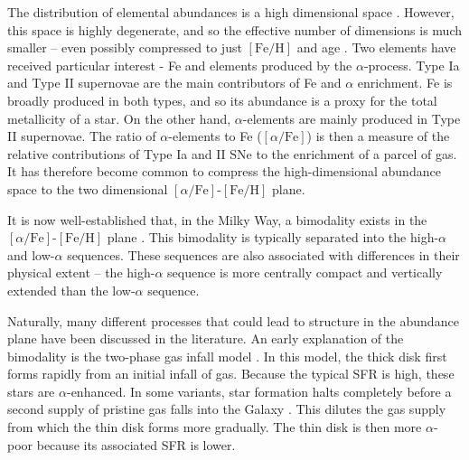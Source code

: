 \documentclass[linenumbers, twocolumn]{aastex631}
\newcommand{\FeH}{\ensuremath{[\textrm{Fe}/\textrm{H}]}}
\newcommand{\alphaFe}{\ensuremath{[\alpha/\textrm{Fe}]}}
\begin{document}

The distribution of elemental abundances is a high dimensional space \citep[e.g., 32 elements in][]{2024ApJ...961L..41J}. However, this space is highly degenerate, and so the effective number of dimensions is much smaller -- even possibly compressed to just \FeH{} and age \citep{2019ApJ...883..177N}. Two elements have received particular interest - Fe and elements produced by the $\alpha$-process. Type Ia and Type II supernovae are the main contributors of Fe and $\alpha$ enrichment. Fe is broadly produced in both types, and so its abundance is a proxy for the total metallicity of a star. On the other hand, $\alpha$-elements are mainly produced in Type II supernovae. The ratio of $\alpha$-elements to Fe (\alphaFe{}) is then a measure of the relative contributions of Type Ia and II SNe to the enrichment of a parcel of gas. It has therefore become common to compress the high-dimensional abundance space to the two dimensional \alphaFe{}-\FeH{} plane.

It is now well-established that, in the Milky Way, a bimodality exists in the \alphaFe{}-\FeH{} plane \citep{1996ASPC...92..307G,1998A&A...338..161F,2004AN....325....3F,2006MNRAS.367.1329R,2011A&A...535L..11A,2012A&A...545A..32A,2014A&A...562A..71B,2014ApJ...796...38N,2020MNRAS.493.2952H}. This bimodality is typically separated into the high-$\alpha$ and low-$\alpha$ sequences. These sequences are also associated with differences in their physical extent -- the high-$\alpha$ sequence is more centrally compact and vertically extended than the low-$\alpha$ sequence.

Naturally, many different processes that could lead to structure in the abundance plane have been discussed in the literature. An early explanation of the bimodality is the two-phase gas infall model \citep{1997ApJ...477..765C,2009IAUS..254..191C,2017MNRAS.472.3637G,2019A&A...623A..60S}. In this model, the thick disk first forms rapidly from an initial infall of gas. Because the typical SFR is high, these stars are $\alpha$-enhanced. In some variants, star formation halts completely before a second supply of pristine gas falls into the Galaxy \citep[][and references therein]{2024arXiv240511025S}. This dilutes the gas supply from which the thin disk forms more gradually. The thin disk is then more $\alpha$-poor because its associated SFR is lower.
\end{document}

